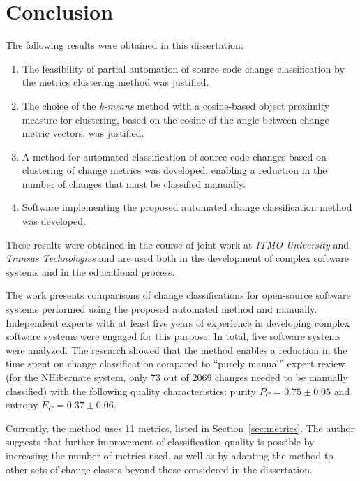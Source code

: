 \documentclass[11pt,a4paper]{article}
\begin{document}
\section{Conclusion}
\label{sec:conclusion}

The following results were obtained in this dissertation:

\begin{enumerate}
    \item The feasibility of partial automation of source code change classification by the metrics clustering method was justified.
    \item The choice of the \textit{k-means} method with a cosine-based object proximity measure for clustering, based on the cosine of the angle between change metric vectors, was justified.
    \item A method for automated classification of source code changes based on clustering of change metrics was developed, enabling a reduction in the number of changes that must be classified manually.
    \item Software implementing the proposed automated change classification method was developed.
\end{enumerate}

These results were obtained in the course of joint work at \textit{ITMO University} and \textit{Transas Technologies} and are used both in the development of complex software systems and in the educational process.

The work presents comparisons of change classifications for open-source software systems performed using the proposed automated method and manually. Independent experts with at least five years of experience in developing complex software systems were engaged for this purpose. In total, five software systems were analyzed. The research showed that the method enables a reduction in the time spent on change classification compared to ``purely manual'' expert review (for the NHibernate system, only 73 out of 2069 changes needed to be manually classified) with the following quality characteristics: purity $P_C = 0.75 \pm 0.05$ and entropy $E_C = 0.37 \pm 0.06$.

Currently, the method uses 11 metrics, listed in Section~\ref{sec:metrics}. The author suggests that further improvement of classification quality is possible by increasing the number of metrics used, as well as by adapting the method to other sets of change classes beyond those considered in the dissertation.
\end{document}

